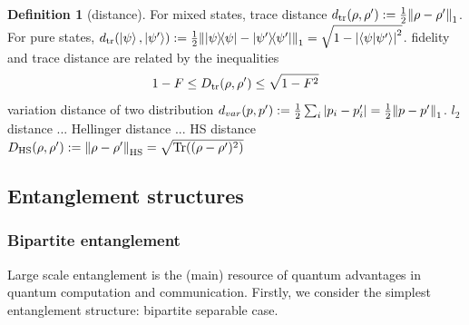 \documentclass[
10pt,
aps,
pra,
linenumbers,
floatfix,
]{revtex4-2}
\theoremstyle{plain}
\theoremstyle{definition}
\newtheorem{definition}{Definition}
\newcommand{\dm}{\rho}
\begin{document}
\begin{definition}[distance]\label{def:distance}
	For mixed states, trace distance $d_{\tr}(\dm,\dm') : = \frac{1}{2} \norm{\dm-\dm'}_1$.
	For pure states, $d_{\tr}(\ket{\psi},\ket{\psi'}) : = \frac{1}{2}\norm{\op{\psi} -\op{\psi'}}_1 = \sqrt{1-\abs{\ip{\psi}{\psi'}}^2}$.
	fidelity and trace distance are related by the inequalities
	\begin{equation}
		1-F\le D_{\tr}(\dm,\dm') \le \sqrt{1-F^2}
	\end{equation}
	variation distance of two distribution $d_{var}(p,p') : = \frac{1}{2} \sum_i \abs{p_i-p_i'} = \frac{1}{2} \norm{p-p'}_1$.
	$l_2$ distance ... Hellinger distance ... HS distance $D_{\text{HS}}(\dm,\dm'): = \norm{\dm-\dm'}_{\text{HS}}=\sqrt{\Tr((\dm-\dm')^2)}$
\end{definition}

\subsection{Entanglement structures}

\subsubsection{Bipartite entanglement}
Large scale entanglement is the (main) resource of quantum advantages in quantum computation and communication.
Firstly, we consider the simplest entanglement structure: bipartite separable case.
\end{document}
